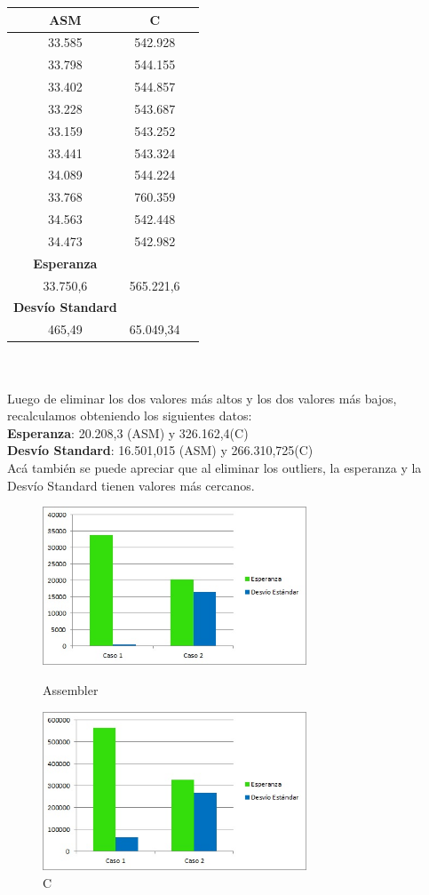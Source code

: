         \begin{tabular}[c]{|c|c|c|}
	\hline
		\textbf{ASM} & \textbf{C}\\
		\hline
33.585 &	542.928 \\
\hline
33.798 &	544.155 \\
\hline
33.402 &	544.857 \\
\hline
33.228 &	543.687 \\
\hline
33.159 &	543.252 \\
\hline
33.441 &	543.324 \\
\hline
34.089 &	544.224 \\ 
\hline
33.768 &	760.359 \\ 
\hline
34.563 &	542.448 \\
\hline
34.473 &	542.982 \\
\hline
		\textbf{Esperanza}	\\
		\hline
33.750,6 & 565.221,6	\\		
		\hline
		\textbf{Desvío Standard}	\\
		\hline
465,49 & 65.049,34\\
		\hline
	\end{tabular}\\\\
	Luego de eliminar los dos valores m\'as altos y los dos valores m\'as bajos, recalculamos obteniendo los siguientes datos: \\
	\textbf{Esperanza}: 20.208,3 (ASM) y 326.162,4(C)\\
	\textbf{Desvío Standard}:	16.501,015 (ASM) y 266.310,725(C)\\
	Ac\'a tambi\'en se puede apreciar que al eliminar los outliers, la esperanza y la Desvío Standard tienen valores m\'as cercanos. \\
\newpage
\begin{figure}
  \begin{center}
	\includegraphics[width=0.7\textwidth]{imagenes/13/asm2.jpg}
	\caption{Assembler}
	\includegraphics[width=0.7\textwidth]{imagenes/13/C2.jpg}
	\caption{C}
  \end{center}
\end{figure}
